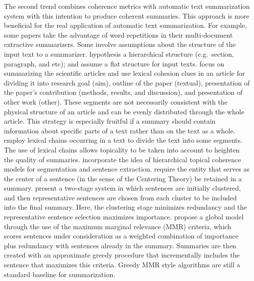 The second trend combines coherence metrics with automatic text summarization system with this intention to produce coherent summaries.  
This approach is more beneficial for the real application of automatic text summarization. 
For example, some papers \cite{radev04a,nenkova05} take the advantage of word repetitions in their multi-document extractive summarizers. 
Some involve assumptions about the structure of the input text to a summarizer. 
 hypothesis a hierarchical structure (e.g.\ section, paragraph, and etc); and  assume a flat structure for input texts. 
 focus on summarizing the scientific articles and use lexical cohesion clues in an article for dividing it into research goal (aim), outline of the paper (textual), presentation of the paper's contribution (methods, results, and discussion), and presentation of other work (other). 
These segments are not necessarily consistent with the physical structure of an article and can be evenly distributed through the whole article. 
This strategy is especially fruitful if a summary should contain information about specific parts of a text rather than on the text as a whole.  
 employ lexical chains occurring in a text to divide the text into some segments.  
The use of lexical chains allows topicality to be taken into account to heighten the quality of summaries.
 incorporate the idea of hierarchical topical coherence models for segmentation and sentence extraction. 
 require the entity that serves as the center of a sentence (in the sense of the Centering Theory) be retained in a summary. 
 present a \mbox{two-stage} system in which sentences are initially clustered, and then representative sentences are chosen from each cluster to be included into the final summary. 
Here, the clustering stage minimizes redundancy and the representative sentence selection maximizes importance.
 propose a global model through the use of the maximum marginal relevance (MMR) criteria, which scores sentences under consideration as a weighted combination of importance plus redundancy with sentences already in the summary. 
Summaries are then created with an approximate greedy procedure that incrementally includes the sentence that maximizes this criteria. Greedy MMR style algorithms are still a standard baseline for summarization. 

